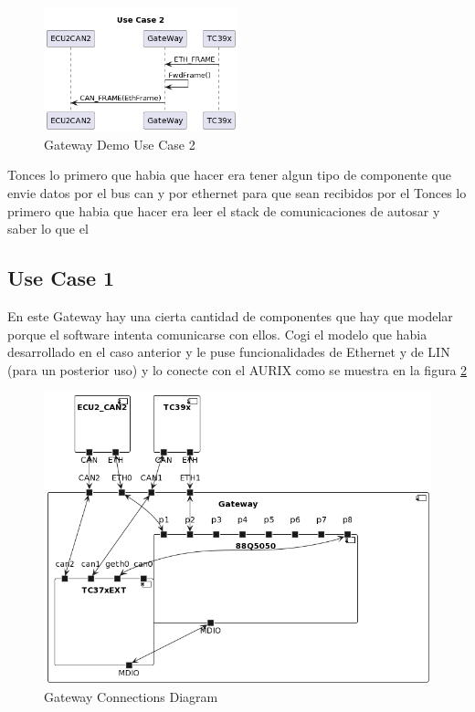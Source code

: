 \begin{figure}[!htb]
 \centering
 \includegraphics[width=0.5\textwidth]{img/GWUseCase2.png}
 \caption{Gateway Demo Use Case 2}
 \label{fig:gw-demo-uc2}
\end{figure}

Tonces lo primero que habia que hacer era tener algun tipo de componente que envie datos por el bus can y por ethernet para que sean recibidos por el 
Tonces lo primero que habia que hacer era leer el stack de comunicaciones de autosar y saber lo que el 
\subsection{Use Case 1}
En este Gateway hay una cierta cantidad de componentes que hay que modelar porque el software intenta comunicarse con ellos. Cogi el modelo que habia desarrollado en el caso anterior y le puse funcionalidades de Ethernet y de LIN (para un posterior uso) y lo conecte con el AURIX como se muestra en la figura \ref{fig:connections-diagram}

\begin{figure}[!htb]
 \centering
 \includegraphics[width=\textwidth]{img/GWConnectionsDiagram.png}
 \caption{Gateway Connections Diagram}
 \label{fig:connections-diagram}
\end{figure}

